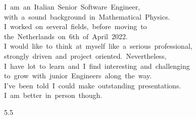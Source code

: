 \documentclass[9pt]{developercv} %
\begin{document}
\vspace{0.5cm}



\begin{minipage}[t]{0.4\textwidth} %
	\vspace{-\baselineskip} %

	\mbox{I am an Italian Senior Software Engineer,} 
	\linebreak
	\mbox{with a sound background in Mathematical Physics.}
	\mbox{I worked on several fields, before moving to}
	\linebreak
	\mbox{the Netherlands on 6th of April 2022.}
	\linebreak
	\mbox{I would like to think at myself like a serious professional,}
	\linebreak
	\mbox{strongly driven and project oriented. Nevertheless, }
	\linebreak
	\mbox{I have lot to learn and I find interesting and challenging}
	\linebreak
	\mbox{to grow with junior Engineers along the way.}
	\linebreak
	\mbox{I've been told I could make outstanding presentations.}
	\linebreak
	\mbox{I am better in person though.}
	
\end{minipage}
\hfill %
\begin{minipage}[t]{0.5\textwidth} %
	\vspace{-\baselineskip} %
	\begin{barchart}{5.5}
	\end{barchart}
\end{minipage}

\begin{center}
\end{center}
\end{document}
